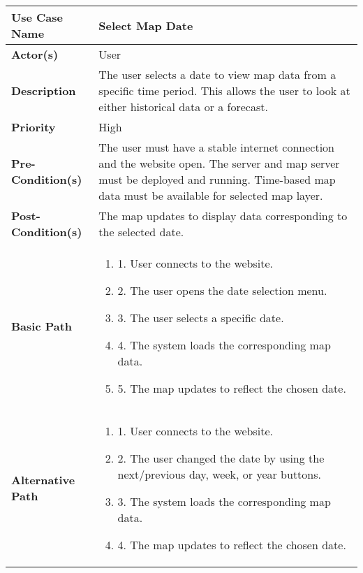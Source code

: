 \begin{table}[h]
    \centering
    \renewcommand{\arraystretch}{1.5}
    \begin{tabularx}{\textwidth}{|l|X|}
        \hline
        \rowcolor{gray!20}
        \textbf{Use Case Name} & Select Map Date \\
        \hline
        \textbf{Actor(s)} & User \\
        \hline
        \textbf{Description} & The user selects a date to view map data from a specific time period. This allows the user to look at either historical data or a forecast. \\
        \hline
        \textbf{Priority} & High \\
        \hline
        \textbf{Pre-Condition(s)} & The user must have a stable internet connection and the website open. The server and map server must be deployed and running. Time-based map data must be available for selected map layer. \\
        \hline
        \textbf{Post-Condition(s)} & The map updates to display data corresponding to the selected date. \\
        \hline
        \textbf{Basic Path} &  
        \begin{enumerate}[label=,left=0pt]
            \item 1. User connects to the website.
            \item 2. The user opens the date selection menu.
            \item 3. The user selects a specific date.
            \item 4. The system loads the corresponding map data.
            \item 5. The map updates to reflect the chosen date.
        \end{enumerate} \\
        \hline
        \textbf{Alternative Path} & 
        \begin{enumerate}[label=,left=0pt]
            \item 1. User connects to the website.
            \item 2. The user changed the date by using the next/previous day, week, or year buttons.
            \item 3. The system loads the corresponding map data.
            \item 4. The map updates to reflect the chosen date.
        \end{enumerate} \\

\end{tabularx}
\end{table}

